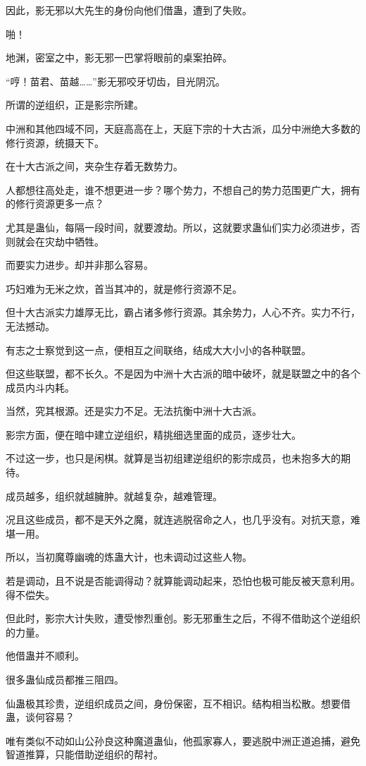 \begin{this_body}
因此，影无邪以大先生的身份向他们借蛊，遭到了失败。

啪！

地渊，密室之中，影无邪一巴掌将眼前的桌案拍碎。

“哼！苗君、苗越……”影无邪咬牙切齿，目光阴沉。

所谓的逆组织，正是影宗所建。

中洲和其他四域不同，天庭高高在上，天庭下宗的十大古派，瓜分中洲绝大多数的修行资源，统摄天下。

在十大古派之间，夹杂生存着无数势力。

人都想往高处走，谁不想更进一步？哪个势力，不想自己的势力范围更广大，拥有的修行资源更多一点？

尤其是蛊仙，每隔一段时间，就要渡劫。所以，这就要求蛊仙们实力必须进步，否则就会在灾劫中牺牲。

而要实力进步。却并非那么容易。

巧妇难为无米之炊，首当其冲的，就是修行资源不足。

但十大古派实力雄厚无比，霸占诸多修行资源。其余势力，人心不齐。实力不行，无法撼动。

有志之士察觉到这一点，便相互之间联络，结成大大小小的各种联盟。

但这些联盟，都不长久。不是因为中洲十大古派的暗中破坏，就是联盟之中的各个成员内斗内耗。

当然，究其根源。还是实力不足。无法抗衡中洲十大古派。

影宗方面，便在暗中建立逆组织，精挑细选里面的成员，逐步壮大。

不过这一步，也只是闲棋。就算是当初组建逆组织的影宗成员，也未抱多大的期待。

成员越多，组织就越臃肿。就越复杂，越难管理。

况且这些成员，都不是天外之魔，就连逃脱宿命之人，也几乎没有。对抗天意，难堪一用。

所以，当初魔尊幽魂的炼蛊大计，也未调动过这些人物。

若是调动，且不说是否能调得动？就算能调动起来，恐怕也极可能反被天意利用。得不偿失。

但此时，影宗大计失败，遭受惨烈重创。影无邪重生之后，不得不借助这个逆组织的力量。

他借蛊并不顺利。

很多蛊仙成员都推三阻四。

仙蛊极其珍贵，逆组织成员之间，身份保密，互不相识。结构相当松散。想要借蛊，谈何容易？

唯有类似不动如山公孙良这种魔道蛊仙，他孤家寡人，要逃脱中洲正道追捕，避免智道推算，只能借助逆组织的帮衬。


\end{this_body}
